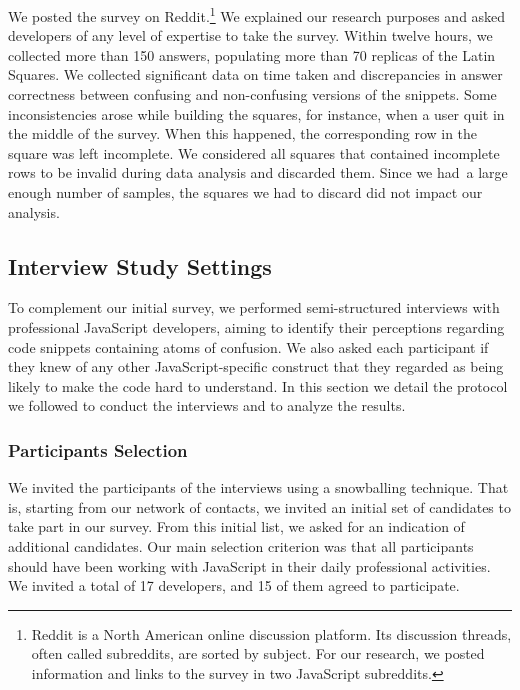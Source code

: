 We posted the survey on Reddit.\footnote{Reddit is a North American online discussion platform.
Its discussion threads, often called subreddits, are sorted by subject. For our research, we posted information and links to the survey in two JavaScript subreddits.} We explained our research purposes and asked developers of any level of expertise to take the survey. Within twelve hours, we collected more than 150 answers, populating more than 70 replicas of the Latin Squares. We collected significant data on time taken and discrepancies in answer correctness between confusing and non-confusing versions of the snippets. Some inconsistencies arose while building the squares, for instance, when a user quit in the middle of the survey. When this happened, the corresponding row in the square was left incomplete. We considered all squares that contained incomplete rows to be invalid during data analysis and discarded them. Since we had\
 a large enough number of samples, the squares we had to discard did not impact our analysis.

 
\subsection{Interview Study Settings}

To complement our initial survey, we performed semi-structured interviews with professional JavaScript developers, aiming to identify their perceptions regarding code snippets containing atoms of confusion. We also asked each participant if they knew of any other JavaScript-specific construct that they regarded as being likely to make the code hard to understand. In this section we detail the protocol we followed to conduct the interviews and to analyze the results.


\subsubsection*{Participants Selection} We invited the participants of the interviews using a snowballing technique. That is, starting from our network of contacts, we invited an initial set of candidates to take part in our survey. From this initial list, we asked for an indication of additional candidates. Our main selection criterion was that all participants should have been working with JavaScript in their daily professional activities. We invited a total of 17 developers, and 15 of them agreed to participate.


